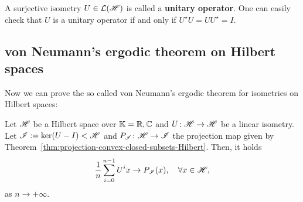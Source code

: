 A surjective isometry $U\in\mathcal{L}(\mathscr{H})$ is called a \textbf{unitary operator}. One can easily check that $U$ is a unitary operator if and only if $U^{\star} U = UU^{\star}=I$.

\subsection{von Neumann's ergodic theorem on Hilbert spaces}
\label{sec:von-neumanns-ergodic-thm}


Now we can prove the so called von Neumann's ergodic theorem for isometries on Hilbert spaces:

\begin{theorem}\label{thm:von-Neumann-ergodic-isometries-Hilbert-spaces}
  Let $\mathscr{H}$ be a Hilbert space over $\mathbb{K}=\mathbb{R},\mathbb{C}$ and $U\colon\mathscr{H}\to\mathscr{H}$ be a linear isometry. Let $\mathscr{I}:=\ker(U-I)<\mathscr{H}$ and $P_{\mathscr{I}}\colon\mathscr{H}\to\mathscr{I}$ the projection map given by Theorem~\ref{thm:projection-convex-closed-subsets-Hilbert}. Then, it holds
  \begin{displaymath}
    \frac{1}{n}\sum_{i=0}^{n-1} U^{i}x\to P_{\mathscr{I}}(x), \quad\forall x\in\mathscr{H},
  \end{displaymath}
  as $n\to+\infty$.
\end{theorem}

